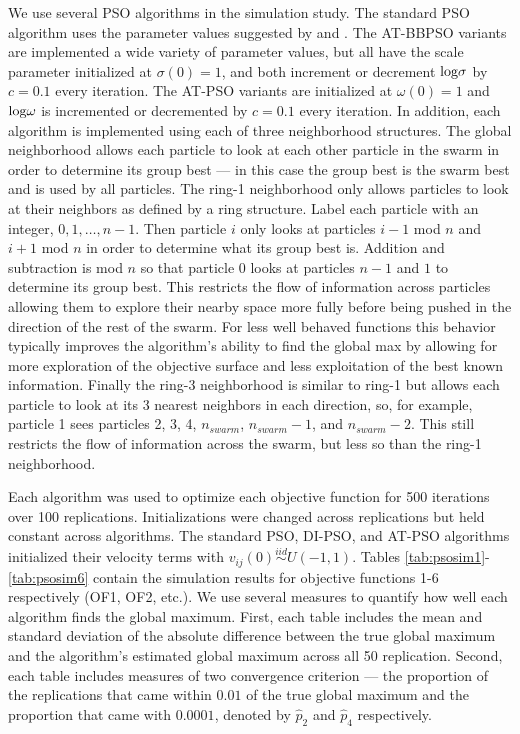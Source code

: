 \documentclass[12pt]{article}
\def\log{\hbox{log}}
\begin{document}
We use several PSO algorithms in the simulation study. The standard PSO algorithm uses the parameter values suggested by \cite{blum2008swarm} and \cite{clerc2002particle}. The AT-BBPSO variants are implemented a wide variety of parameter values, but all have the scale parameter initialized at $\sigma(0)=1$, and both increment or decrement $\log\sigma$ by $c=0.1$ every iteration. The AT-PSO variants are initialized at $\omega(0)=1$ and $\log\omega$ is incremented or decremented by $c=0.1$ every iteration. In addition, each algorithm is implemented using each of three neighborhood structures. The global neighborhood allows each particle to look at each other particle in the swarm in order to determine its group best --- in this case the group best is the swarm best and is used by all particles. The ring-1 neighborhood only allows particles to look at their neighbors as defined by a ring structure. Label each particle with an integer, $0, 1, \dots, n-1$. Then particle $i$ only looks at particles $i-1$ mod $n$ and $i+1$ mod $n$ in order to determine what its group best is. Addition and subtraction is mod $n$ so that particle $0$ looks at particles $n-1$ and $1$ to determine its group best. This restricts the flow of information across particles allowing them to explore their nearby space more fully before being pushed in the direction of the rest of the swarm. For less well behaved functions this behavior typically improves the algorithm's ability to find the global max by allowing for more exploration of the objective surface and less exploitation of the best known information. Finally the ring-3 neighborhood is similar to ring-1 but allows each particle to look at its 3 nearest neighbors in each direction, so, for example, particle 1 sees particles 2, 3, 4, $n_{swarm}$, $n_{swarm} -1$, and $n_{swarm}-2$. This still restricts the flow of information across the swarm, but less so than the ring-1 neighborhood. 

Each algorithm was used to optimize each objective function for 500 iterations over 100 replications. Initializations were changed across replications but held constant across algorithms. The standard PSO, DI-PSO, and AT-PSO algorithms initialized their velocity terms with $v_{ij}(0)\stackrel{iid}{\sim}U(-1,1)$. Tables \ref{tab:psosim1}-\ref{tab:psosim6} contain the simulation results for objective functions 1-6 respectively (OF1, OF2, etc.). We use several measures to quantify how well each algorithm finds the global maximum. First, each table includes the mean and standard deviation of the absolute difference between the true global maximum and the algorithm's estimated global maximum across all 50 replication. Second, each table includes measures of two convergence criterion --- the proportion of the replications that came within $0.01$ of the true global maximum and the proportion that came with $0.0001$, denoted by $\widehat{p}_2$ and $\widehat{p}_4$ respectively. 
\end{document}

